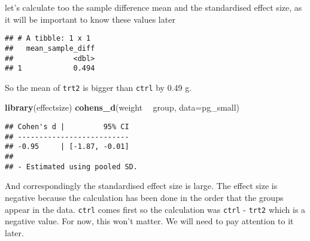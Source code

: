 \documentclass[
]{book}
\newenvironment{Shaded}{\begin{snugshade}}{\end{snugshade}}
\newcommand{\DataTypeTok}[1]{\textcolor[rgb]{0.13,0.29,0.53}{#1}}
\newcommand{\KeywordTok}[1]{\textcolor[rgb]{0.13,0.29,0.53}{\textbf{#1}}}
\newcommand{\NormalTok}[1]{#1}
\newcommand{\OperatorTok}[1]{\textcolor[rgb]{0.81,0.36,0.00}{\textbf{#1}}}
\newcommand{\StringTok}[1]{\textcolor[rgb]{0.31,0.60,0.02}{#1}}
\begin{document}
let's calculate too the sample difference mean and the standardised effect size, as it will be important to know these values later

\begin{Shaded}
\end{Shaded}

\begin{verbatim}
## # A tibble: 1 x 1
##   mean_sample_diff
##              <dbl>
## 1            0.494
\end{verbatim}

So the mean of \texttt{trt2} is bigger than \texttt{ctrl} by 0.49 g.

\begin{Shaded}
\begin{Highlighting}[]
\KeywordTok{library}\NormalTok{(effectsize)}
\KeywordTok{cohens_d}\NormalTok{(weight }\OperatorTok{~}\StringTok{ }\NormalTok{group, }\DataTypeTok{data=}\NormalTok{pg_small)}
\end{Highlighting}
\end{Shaded}

\begin{verbatim}
## Cohen's d |         95% CI
## --------------------------
## -0.95     | [-1.87, -0.01]
## 
## - Estimated using pooled SD.
\end{verbatim}

And correspondingly the standardised effect size is large. The effect size is negative because the calculation has been done in the order that the groups appear in the data. \texttt{ctrl} comes first so the calculation was \texttt{ctrl} - \texttt{trt2} which is a negative value. For now, this won't matter. We will need to pay attention to it later.
\end{document}
